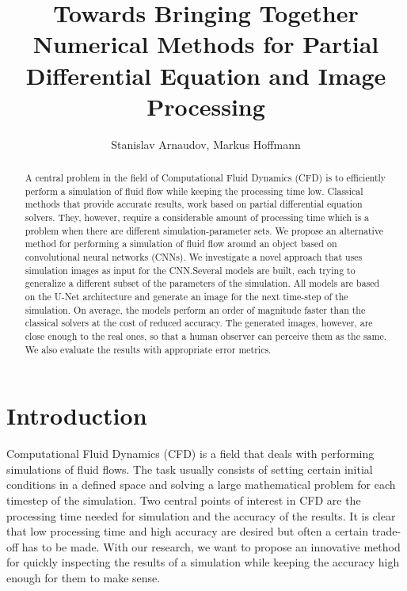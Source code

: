 \documentclass{llncs}
\begin{document}
\pagestyle{headings}
\mainmatter{}
\title{Towards Bringing Together Numerical Methods for Partial Differential Equation and Image Processing}
\author{Stanislav Arnaudov, Markus Hoffmann}

\maketitle

\begin{abstract}
  A central problem in the field of Computational Fluid Dynamics (CFD) is to efficiently perform a simulation of fluid flow while keeping the processing time low. Classical methods that provide accurate results, work based on partial differential equation solvers. They, however, require a considerable amount of processing time which is a problem when there are different simulation-parameter sets. We propose an alternative method for performing a simulation of fluid flow around an object based on convolutional neural networks (CNNs). We investigate a novel approach that uses simulation images as input for the CNN.\@ Several models are built, each trying to generalize a different subset of the parameters of the simulation. All models are based on the U-Net architecture and generate an image for the next time-step of the simulation. On average, the models perform an order of magnitude faster than the classical solvers at the cost of reduced accuracy. The generated images, however, are close enough to the real ones, so that a human observer can perceive them as the same. We also evaluate the results with appropriate error metrics.
\end{abstract}

\section{Introduction}\label{introduction}
Computational Fluid Dynamics (CFD) is a field that deals with performing simulations of fluid flows. The task usually consists of setting certain initial conditions in a defined space and solving a large mathematical problem for each timestep of the simulation. Two central points of interest in CFD are the processing time needed for simulation and the accuracy of the results. It is clear that low processing time and high accuracy are desired but often a certain trade-off has to be made. With our research, we want to propose an innovative method for quickly inspecting the results of a simulation while keeping the accuracy high enough for them to make sense.
\end{document}
